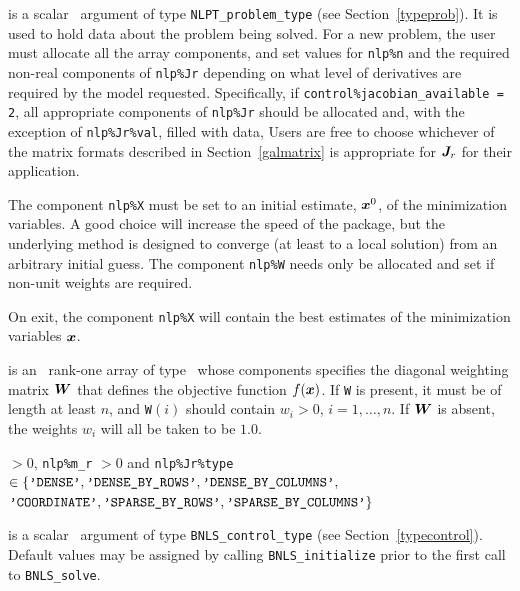 \documentclass{galahad}
\newcommand{\packagename}{BNLS}
\begin{document}
\vspace*{-2mm}
\begin{description}
 is a scalar \intentinout\ argument of type
{\tt NLPT\_problem\_type}
(see Section~\ref{typeprob}).
It is used to hold data about the problem being solved.
For a new problem, the user must allocate all the array components,
and set values for {\tt nlp\%n}
and the required non-real components of
{\tt nlp\%Jr} depending on what level
of derivatives are required by the model requested. Specifically,
if {\tt control\%jacobian\_available = 2},
all appropriate components of {\tt nlp\%Jr} should be allocated and, 
with the exception of {\tt nlp\%Jr\%val},
filled with data,
Users are free to choose whichever
of the matrix formats described in Section~\ref{galmatrix}
is appropriate for ${\bm{J}}_r$ for their application.

\noindent
The component {\tt nlp\%X} must be set to an initial estimate, ${\bm{x}}^{0}$,
of the minimization variables. A good choice will increase the speed
of the package, but the underlying method is designed to converge (at least
to a local solution) from an arbitrary initial guess.
The component {\tt nlp\%W} needs only be allocated and set if
non-unit weights are required.

\noindent
On exit, the component {\tt nlp\%X} will contain the best estimates of the
minimization variables ${\bm{x}}$.

 is an \optional\ rank-one array of type \realdp\
whose components specifies the diagonal weighting matrix ${\bm{W}}$ that
defines the objective function $f({\bm{x}})$. If {\tt W} is present, it
must be of length at least $n$, and {\tt W}$(i)$ should contain $w_i > 0$,
$i = 1, \ldots, n$. If ${\bm{W}}$ is absent, the weights $w_i$ will all be
taken to be $1.0$.

\noindent
{} $> 0$, {\tt nlp\%m\_r} $> 0$ and
{\tt nlp\%Jr\%type} $\in \{
  \mbox{\tt 'DENSE'}, \mbox{\tt 'DENSE\_BY\_ROWS'}, 
  \mbox{\tt 'DENSE\_BY\_COLUMNS'},$ $
  \mbox{\tt 'COORDINATE'}, \mbox{\tt 'SPARSE\_BY\_ROWS'},
  \mbox{\tt 'SPARSE\_BY\_COLUMNS'} \}$ 

 is a scalar \intentin\ argument of type
{\tt \packagename\_control\_type}
(see Section~\ref{typecontrol}). Default values may be assigned by calling
{\tt \packagename\_initialize} prior to the first call to
{\tt \packagename\_solve}. 


\end{description}
\end{document}
